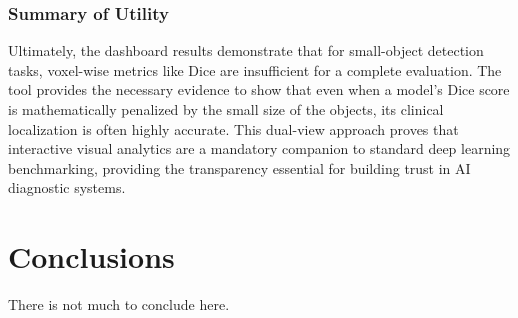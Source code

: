 \documentclass{aifyp}
\begin{document}
\subsubsection{Summary of Utility}
Ultimately, the dashboard results demonstrate that for small-object detection tasks, voxel-wise metrics like Dice are insufficient for a complete evaluation. The tool provides the necessary evidence to show that even when a model's Dice score is mathematically penalized by the small size of the objects, its clinical localization is often highly accurate. This dual-view approach proves that interactive visual analytics are a mandatory companion to standard deep learning benchmarking, providing the transparency essential for building trust in AI diagnostic systems.

\section{Conclusions}

There is not much to conclude here.

\pagebreak


\nocite{*}



\end{document}
